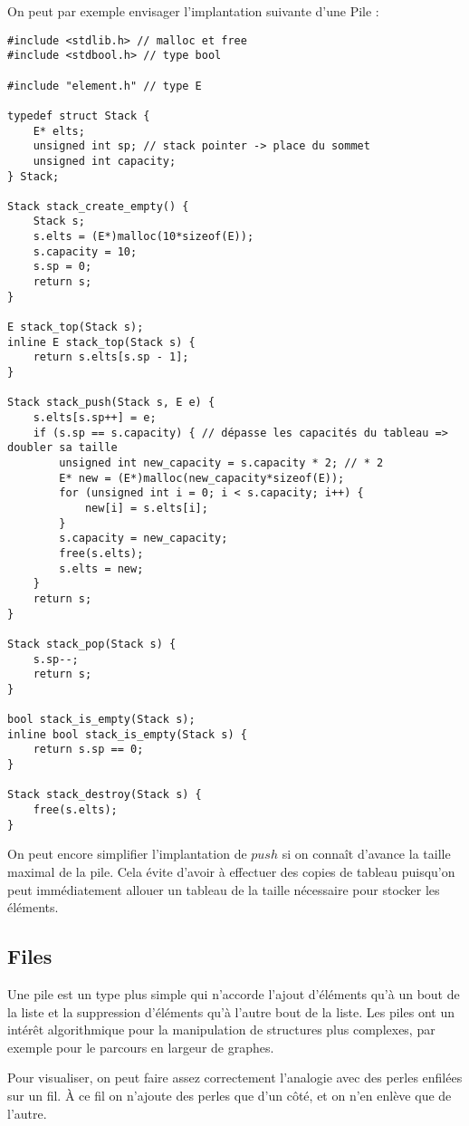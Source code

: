 \documentclass[../../../main.tex]{subfiles}
\begin{document}
On peut par exemple envisager l'implantation suivante d'une Pile :
\begin{verbatim}
#include <stdlib.h> // malloc et free
#include <stdbool.h> // type bool

#include "element.h" // type E

typedef struct Stack {
	E* elts;
	unsigned int sp; // stack pointer -> place du sommet
	unsigned int capacity;
} Stack;

Stack stack_create_empty() {
	Stack s;
	s.elts = (E*)malloc(10*sizeof(E));
	s.capacity = 10;
	s.sp = 0;
	return s;
}

E stack_top(Stack s);
inline E stack_top(Stack s) {
	return s.elts[s.sp - 1];
}

Stack stack_push(Stack s, E e) {
	s.elts[s.sp++] = e;
	if (s.sp == s.capacity) { // dépasse les capacités du tableau => doubler sa taille
		unsigned int new_capacity = s.capacity * 2; // * 2
		E* new = (E*)malloc(new_capacity*sizeof(E));
		for (unsigned int i = 0; i < s.capacity; i++) {
			new[i] = s.elts[i];
		}
		s.capacity = new_capacity;
		free(s.elts);
		s.elts = new;
	}
	return s;
}

Stack stack_pop(Stack s) {
	s.sp--;
	return s;
}

bool stack_is_empty(Stack s);
inline bool stack_is_empty(Stack s) {
	return s.sp == 0;
}

Stack stack_destroy(Stack s) {
	free(s.elts);
}
\end{verbatim}
On peut encore simplifier l'implantation de $push$ si on connaît d'avance la taille maximal de la pile. Cela évite d'avoir à effectuer des copies de tableau puisqu'on peut immédiatement allouer un tableau de la taille nécessaire pour stocker les éléments.
\subsection{Files}
Une pile est un type plus simple qui n'accorde l'ajout d'éléments qu'à un bout de la liste et la suppression d'éléments qu'à l'autre bout de la liste. Les piles ont un intérêt algorithmique pour la manipulation de structures plus complexes, par exemple pour le parcours en largeur de graphes.

Pour visualiser, on peut faire assez correctement l'analogie avec des perles enfilées sur un fil. À ce fil on n'ajoute des perles que d'un côté, et on n'en enlève que de l'autre.

\begin{minipage}{\textwidth}
	\begin{center}
		
	\end{center}
\end{minipage}
\end{document}
